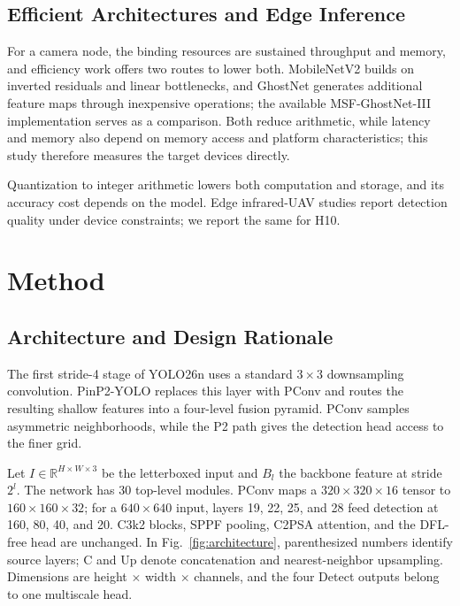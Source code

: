 \documentclass[lettersize,journal]{IEEEtran}
\begin{document}
\subsection{Efficient Architectures and Edge Inference}
For a camera node, the binding resources are sustained throughput and memory, and efficiency work offers two routes to lower both. MobileNetV2 builds on inverted residuals and linear bottlenecks\cite{sandler2018mobilenetv2}, and GhostNet generates additional feature maps through inexpensive operations\cite{han2020ghostnet}; the available MSF-GhostNet-III implementation serves as a comparison\cite{msfcode}. Both reduce arithmetic, while latency and memory also depend on memory access and platform characteristics\cite{ma2018shufflenet}; this study therefore measures the target devices directly.

Quantization to integer arithmetic lowers both computation and storage, and its accuracy cost depends on the model\cite{jacob2018quantization}. Edge infrared-UAV studies report detection quality under device constraints\cite{auvdsource}; we report the same for H10.

\section{Method}
\subsection{Architecture and Design Rationale}
The first stride-4 stage of YOLO26n uses a standard $3\times3$ downsampling convolution. PinP2-YOLO replaces this layer with PConv and routes the resulting shallow features into a four-level fusion pyramid. PConv samples asymmetric neighborhoods, while the P2 path gives the detection head access to the finer grid.

Let $I\in\mathbb{R}^{H\times W\times3}$ be the letterboxed input and $B_l$ the backbone feature at stride $2^l$. The network has 30 top-level modules. PConv maps a $320\times320\times16$ tensor to $160\times160\times32$; for a $640\times640$ input, layers 19, 22, 25, and 28 feed detection at 160, 80, 40, and 20. C3k2 blocks, SPPF pooling, C2PSA attention, and the DFL-free head are unchanged. In Fig.~\ref{fig:architecture}, parenthesized numbers identify source layers; C and Up denote concatenation and nearest-neighbor upsampling. Dimensions are height $\times$ width $\times$ channels, and the four Detect outputs belong to one multiscale head.
\end{document}
